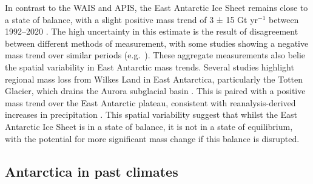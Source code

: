 In contrast to the WAIS and APIS, the East Antarctic Ice Sheet remains close to a state of balance, with a slight positive mass trend of 3 ± 15 Gt yr$^{-1}$ between 1992--2020 \citep{otosakaMassBalanceGreenland2023a}. The high uncertainty in this estimate is the result of disagreement between different methods of measurement, with some studies showing a negative mass trend over similar periods (e.g.~\citealt{rignotFourDecadesAntarctic2019,shepherdTrendsAntarcticIce2019}). These aggregate measurements also belie the spatial variability in East Antarctic mass trends. Several studies highlight regional mass loss from Wilkes Land in East Antarctica, particularly the Totten Glacier, which drains the Aurora subglacial basin \citep{shepherdTrendsAntarcticIce2019,velicognaContinuityIceSheet2020,smithPervasiveIceSheet2020}. This is paired with a positive mass trend over the East Antarctic plateau, consistent with reanalysis-derived increases in precipitation \citep{davisSnowfallDrivenGrowthEast2005}. This spatial variability suggest that whilst the East Antarctic Ice Sheet is in a state of balance, it is not in a state of equilibrium, with the potential for more significant mass change if this balance is disrupted.



\subsection{Antarctica in past climates}\label{section:antarctica-in-past-climates}


